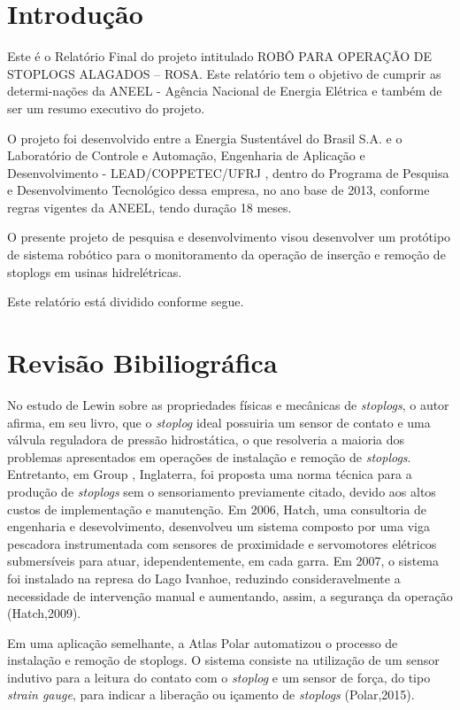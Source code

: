 \section{Introdução}
Este é o Relatório Final do projeto intitulado ROBÔ PARA OPERAÇÃO DE STOPLOGS
ALAGADOS – ROSA. Este relatório tem o objetivo de cumprir as determi-\-nações da 
ANEEL - Agência Nacional de Energia Elétrica e também de ser um resumo executivo
do projeto.

O projeto foi desenvolvido entre a Energia Sustentável do Brasil S.A. e o
Laboratório de Controle e Automação, Engenharia de Aplicação e
Desenvolvimento - LEAD/COPPETEC/UFRJ , dentro do Programa de Pesquisa e
Desenvolvimento Tecnológico dessa empresa, no ano base de 2013, conforme regras vigentes da ANEEL, tendo
duração 18 meses.

O presente projeto de pesquisa e desenvolvimento visou desenvolver um protótipo
de sistema robótico para o monitoramento da operação de inserção e remoção
de stoplogs em usinas hidrelétricas.

Este relatório está dividido conforme segue.

\section{Revisão Bibiliográfica}

No estudo de Lewin \cite{jack} sobre as propriedades físicas e mecânicas de 
\textit{stoplogs}, o autor afirma, em seu livro, que o
\textit{stoplog} ideal possuiria um sensor de contato e uma válvula reguladora
de pressão hidrostática, o que resolveria a maioria dos problemas apresentados
em operações de instalação e remoção de \textit{stoplogs}. Entretanto, em Group
\cite{pinc}, Inglaterra, foi proposta uma norma técnica para a produção de
\textit{stoplogs} sem o sensoriamento previamente citado, devido aos altos custos de implementação e manutenção. Em
2006, Hatch, uma consultoria de engenharia e desevolvimento,
desenvolveu um sistema composto por uma viga pescadora instrumentada com sensores de
proximidade e servomotores elétricos submersíveis para atuar, idependentemente,
em cada garra. Em 2007, o sistema foi instalado na represa do Lago Ivanhoe,
reduzindo consideravelmente a necessidade de intervenção manual e aumentando,
assim, a segurança da operação (Hatch,2009)\cite{hatch}.

Em uma aplicação semelhante, a Atlas Polar automatizou o processo
de instalação e remoção de stoplogs. O sistema consiste na utilização de um
sensor indutivo para a leitura do contato com o \textit{stoplog} e um sensor de força, do tipo
\textit{strain gauge}, para indicar a liberação ou içamento de
\textit{stoplogs} (Polar,2015)\cite{atlas}.

